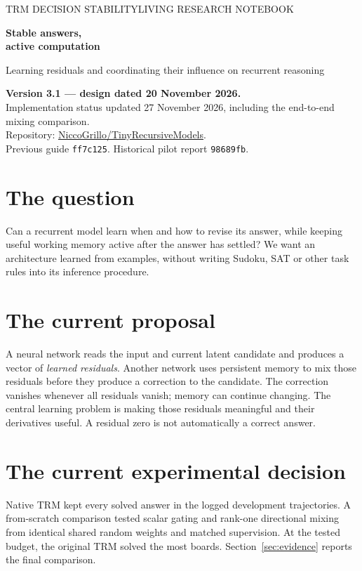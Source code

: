 \documentclass[11pt,a4paper]{article}
\newcommand{\code}[1]{\nolinkurl{#1}}
\begin{document}
\thispagestyle{empty}
{\sffamily\small\color{teal}TRM DECISION STABILITY\hfill LIVING RESEARCH NOTEBOOK\par}
\vspace{14mm}
{\sffamily\Huge\bfseries\color{ink}Stable answers,\\[3pt]active computation\par}
\vspace{7mm}
{\Large Learning residuals and coordinating their influence on recurrent reasoning\par}
\vspace{8mm}
\textbf{Version 3.1 --- design dated 20 November 2026.}\\
Implementation status updated 27 November 2026, including the end-to-end mixing comparison.\\
Repository: \href{https://github.com/NiccoGrillo/TinyRecursiveModels}{NiccoGrillo/TinyRecursiveModels}.\\
Previous guide \code{ff7c125}. Historical pilot report \code{98689fb}.

\section*{The question}
Can a recurrent model learn when and how to revise its answer, while keeping useful working memory active after the answer has settled? We want an architecture learned from examples, without writing Sudoku, SAT or other task rules into its inference procedure.

\section*{The current proposal}
A neural network reads the input and current latent candidate and produces a vector of \emph{learned residuals}. Another network uses persistent memory to mix those residuals before they produce a correction to the candidate. The correction vanishes whenever all residuals vanish; memory can continue changing. The central learning problem is making those residuals meaningful and their derivatives useful. A residual zero is not automatically a correct answer.

\section*{The current experimental decision}
Native TRM kept every solved answer in the logged development trajectories. A from-scratch comparison tested scalar gating and rank-one directional mixing from identical shared random weights and matched supervision. At the tested budget, the original TRM solved the most boards. Section~\ref{sec:evidence} reports the final comparison.
\end{document}
